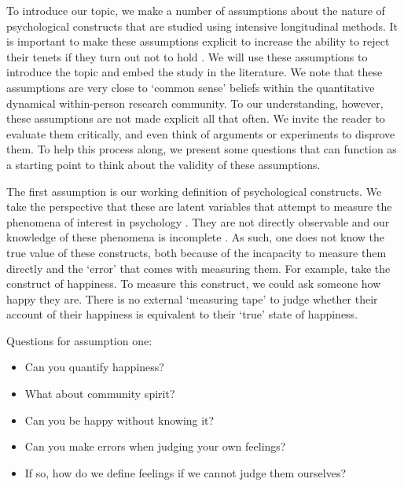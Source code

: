 \documentclass[utf8]{FrontiersinVancouver}
\begin{document}
To introduce our topic, we make a number of assumptions about the nature of psychological constructs that are studied using intensive longitudinal methods. It is important to make these assumptions explicit to increase the ability to reject their tenets if they turn out not to hold \citep{meehlTheoreticalRisksTabular2004}. We will use these assumptions to introduce the topic and embed the study in the literature. We note that these assumptions are very close to `common sense' beliefs within the quantitative dynamical within-person research community. To our understanding, however, these assumptions are not made explicit all that often. We invite the reader to evaluate them critically, and even think of arguments or experiments to disprove them. To help this process along, we present some questions that can function as a starting point to think about the validity of these assumptions. 

The first assumption is our working definition of psychological constructs. We take the perspective that these are latent variables that attempt to measure the phenomena of interest in psychology \citep{borsboomLatentVariableTheory2008}. They are not directly observable and our knowledge of these phenomena is incomplete \citep{friedWhatArePsychological2017, maraunAugustinianMethodologicalFamily2009}. As such, one does not know the true value of these constructs, both because of the incapacity to measure them directly and the `error' that comes with measuring them. For example, take the construct of happiness. To measure this construct, we could ask someone how happy they are. There is no external `measuring tape' to judge whether their account of their happiness is equivalent to their `true' state of happiness.

\begin{framed} 
    Questions for assumption one:
    \begin{itemize}
        \item Can you quantify happiness?
        \item What about community spirit?
        \item Can you be happy without knowing it?
        \item Can you make errors when judging your own feelings?
        \item If so, how do we define feelings if we cannot judge them ourselves?
    \end{itemize}
\end{framed}
\end{document}
